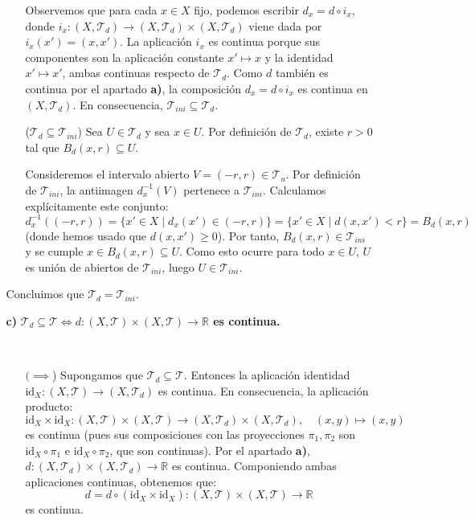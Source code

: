 \begin{enumerate}
\begin{sol}
\begin{enumerate}
\begin{dem}
\begin{itemize}
            Observemos que para cada $x \in X$ fijo, podemos escribir $d_x = d \circ i_x$, donde $i_x : (X, \mathcal{T}_d) \to (X, \mathcal{T}_d) \times (X, \mathcal{T}_d)$ viene dada por $i_x(x') = (x, x')$. La aplicación $i_x$ es continua porque sus componentes son la aplicación constante $x' \mapsto x$ y la identidad $x' \mapsto x'$, ambas continuas respecto de $\mathcal{T}_d$. Como $d$ también es continua por el apartado \textbf{a)}, la composición $d_x = d \circ i_x$ es continua en $(X, \mathcal{T}_d)$. En consecuencia, $\mathcal{T}_{ini} \subseteq \mathcal{T}_d$.

            \item[($\mathcal{T}_d \subseteq \mathcal{T}_{ini}$)] Sea $U \in \mathcal{T}_d$ y sea $x \in U$. Por definición de $\mathcal{T}_d$, existe $r > 0$ tal que $B_d(x, r) \subseteq U$. 
            
            Consideremos el intervalo abierto $V = (-r, r) \in \mathcal{T}_u$. Por definición de $\mathcal{T}_{ini}$, la antiimagen $d_x^{-1}(V)$ pertenece a $\mathcal{T}_{ini}$. Calculamos explícitamente este conjunto:
            \[
                d_x^{-1}((-r, r)) = \{x' \in X \mid d_x(x') \in (-r, r)\} = \{x' \in X \mid d(x, x') < r\} = B_d(x, r)
            \]
            (donde hemos usado que $d(x, x') \ge 0$). Por tanto, $B_d(x, r) \in \mathcal{T}_{ini}$ y se cumple $x \in B_d(x, r) \subseteq U$. Como esto ocurre para todo $x \in U$, $U$ es unión de abiertos de $\mathcal{T}_{ini}$, luego $U \in \mathcal{T}_{ini}$.
        \end{itemize}
        Concluimos que $\mathcal{T}_d = \mathcal{T}_{ini}$.
    \end{dem}

    \item[\textbf{c)}] \textbf{$\mathcal{T}_d \subseteq \mathcal{T} \iff d : (X, \mathcal{T}) \times (X, \mathcal{T}) \to \mathbb{R}$ es continua.}
    
    \begin{dem} \,
        \begin{itemize}
            \item[$(\implies$)] Supongamos que $\mathcal{T}_d \subseteq \mathcal{T}$. Entonces la aplicación identidad $\mathrm{id}_X : (X, \mathcal{T}) \to (X, \mathcal{T}_d)$ es continua. En consecuencia, la aplicación producto:
            \[
                \mathrm{id}_X \times \mathrm{id}_X : (X, \mathcal{T}) \times (X, \mathcal{T}) \to (X, \mathcal{T}_d) \times (X, \mathcal{T}_d), \quad (x, y) \mapsto (x, y)
            \]
            es continua (pues sus composiciones con las proyecciones $\pi_1, \pi_2$ son $\mathrm{id}_X \circ \pi_1$ e $\mathrm{id}_X \circ \pi_2$, que son continuas). Por el apartado \textbf{a)}, $d : (X, \mathcal{T}_d) \times (X, \mathcal{T}_d) \to \mathbb{R}$ es continua. Componiendo ambas aplicaciones continuas, obtenemos que:
            \[
                d = d \circ (\mathrm{id}_X \times \mathrm{id}_X) : (X, \mathcal{T}) \times (X, \mathcal{T}) \to \mathbb{R}
            \]
            es continua.


\end{itemize}
\end{dem}
\end{enumerate}
\end{sol}
\end{enumerate}
